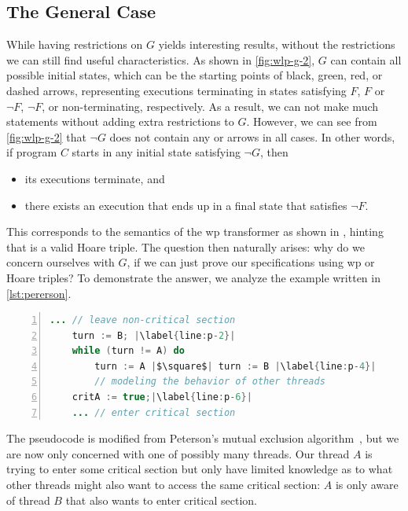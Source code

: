 \subsection{The General Case}
While having restrictions on $G$ yields interesting results, without the restrictions we can still find useful characteristics. 
As shown in \autoref{fig:wlp-g-2}, $G$ can contain all possible initial states, which can be the starting points of black, green, red, or dashed arrows, representing executions terminating in states satisfying $F$, $F$ or $\neg F$, $\neg F$, or non-terminating, respectively. 
As a result, we can not make much statements without adding extra restrictions to $G$. 
However, we can see from \autoref{fig:wlp-g-2} that $\neg G$ does not contain any  or  arrows in all cases. 
In other words, if program $C$ starts in any initial state satisfying $\neg G$, then 
\begin{itemize}
	\item its executions terminate, and
	\item there exists an execution that ends up in a final state that satisfies $\neg F$. 
\end{itemize}

This corresponds to the semantics of the wp transformer as shown in , hinting that  is a valid Hoare triple. 
The question then naturally arises: why do we concern ourselves with $G$, if we can just prove our specifications using wp or Hoare triples? 
To demonstrate the answer, we analyze the example written in \autoref{lst:pererson}. 

\begin{lstlisting}[caption={Thread $A$ Hoping to Access Critical Section}, label={lst:pererson}, language=java, numbers=left, stepnumber=1, captionpos=b,escapechar=|,frame=single]
	... // leave non-critical section
	turn := B; |\label{line:p-2}|
	while (turn != A) do 
		turn := A |$\square$| turn := B |\label{line:p-4}|
		// modeling the behavior of other threads
	critA := true;|\label{line:p-6}|
	... // enter critical section  
\end{lstlisting}

The pseudocode is modified from Peterson's mutual exclusion algorithm~\cite{peterson1981}, but we are now only concerned with one of possibly many threads.
Our thread $A$ is trying to enter some critical section but only have limited knowledge as to what other threads might also want to access the same critical section: $A$ is only aware of thread $B$ that also wants to enter critical section. 

